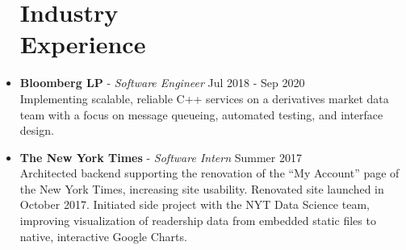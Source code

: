 \documentclass[margin]{res}
\begin{document}
\begin{resume}
\begin{itemize}
\section{Industry \\Experience}
\item[] 
{\bf Bloomberg LP} - {\em{Software Engineer}} \hfill Jul 2018 - Sep 2020\\
Implementing scalable, reliable C++ services on a derivatives market data team with a focus on message queueing, automated testing, and interface design.

\item[]
{\bf The New York Times} - {\em{Software Intern}}  \hfill  Summer 2017\\
Architected backend supporting the renovation of the “My Account” page of the New York Times, increasing site usability. Renovated site launched in October 2017. Initiated side project with the NYT Data Science team, improving visualization of readership data from embedded static files to native, interactive Google Charts.

\end{itemize}


%
%


\end{resume}
\end{document}
